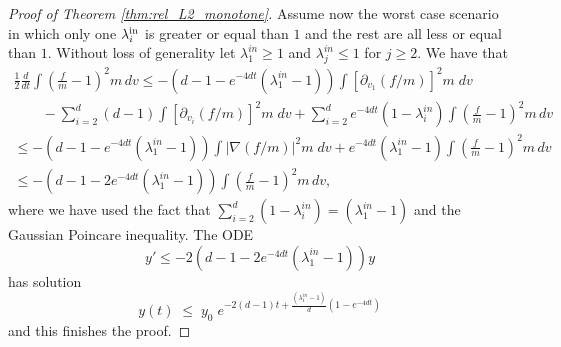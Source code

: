 \documentclass[11pt]{amsart}
\numberwithin{equation}{section}
\begin{document}
\begin{proof}[Proof of Theorem \ref{thm:rel_L2_monotone}]
  Assume now the worst case scenario in which only one $\lambda_i^{\textnormal{in}}$ is greater or equal than $1$ and the rest are all less or equal than $1$. Without loss of generality let $\lambda_1^{in} \ge 1$ and $\lambda_j^{in}\le 1$ for $j\ge 2$.  We have that 
  \begin{equation*}
    \begin{array}{l}
      \displaystyle\frac{1}{2}\frac{d}{dt}\int \left(\frac{f}{ m }-1\right)^{2} m \,dv
  \le - (d-1-e^{-4dt}(\lambda_{1}^{in}-1)) \int \left[\partial_{v_{1}}(f/ m )\right]^{2}m\;dv \\
  \displaystyle \qquad-\sum_{i=2}^d (d-1)\int \left[\partial_{v_{i}}(f/ m )\right]^{2}m\;dv
    +  \sum_{i=2}^d {{{e^{-4dt}}(1-\lambda_{i}^{in})  \int  \left(\frac{f}{m}-1\right) ^{2} m \,dv}}\\
    \displaystyle \le  - (d-1-e^{-4dt}(\lambda_{1}^{in}-1))\int \left| \nabla(f/ m )\right|^{2}m\;dv+ e^{-4dt}(\lambda_{1}^{in}-1) \int \left(\frac{f}{m}-1\right)^{2}m\,dv   \\
    \displaystyle \le - {(d-1-2e^{-4dt}(\lambda_{1}^{in}-1))} \int \left(\frac{f}{m}-1\right)^{2}m\,dv ,
  \end{array}
  \end{equation*}
  where we have used the fact that $\sum_{i=2}^{d} (1-\lambda_{i}^{in}) =  (\lambda_{1}^{in}-1) $ and the Gaussian Poincare inequality. 
  The ODE
  $$
  y' \le - 2{(d-1-2e^{-4dt}(\lambda_{1}^{in}-1))}y
  $$
  has solution 
  $$
  y(t) \;\le\; y_0 \;e^{-2(d-1)t + \frac{(\lambda_{1}^{in}-1)}{d}( 1 - e^{-4dt})}
  $$
  and this finishes the proof. 
\end{proof}
\end{document}
